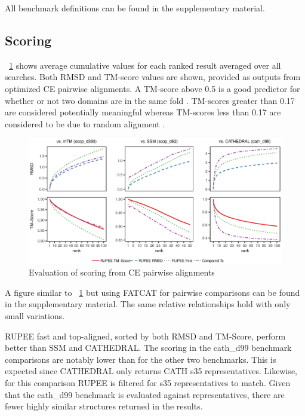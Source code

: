 \documentclass[letter,center,fleqn]{NAR}
\begin{document}
All benchmark definitions can be found in the supplementary material. 

\subsection{Scoring}

\figurename~\ref{fig:combined_scoring_ce} shows average cumulative values for each ranked result averaged over all searches.
Both RMSD and TM-score values are shown, provided as outputs from optimized CE pairwise alignments. 
A TM-score above 0.5 is a good predictor for whether or not two domains are in the same fold \cite{Xu2010}.
TM-scores greater than 0.17 are considered potentially meaningful whereas TM-scores less than 0.17 are considered to be due to random alignment \cite{Zhang2004}.

\begin{figure}[tb]
\begin{center}
\includegraphics{combined_scoring_ce}
\end{center}
\caption{Evaluation of scoring from CE pairwise alignments}
\label{fig:combined_scoring_ce}
\end{figure}

A figure similar to \figurename~\ref{fig:combined_scoring_ce} but using FATCAT for pairwise comparisons can be found in the supplementary material. 
The same relative relationships hold with only small variations. 

RUPEE fast and top-aligned, sorted by both RMSD and TM-Score, perform better than SSM and CATHEDRAL.
The scoring in the cath\_d99 benchmark comparisons are notably lower than for the other two benchmarks. 
This is expected since CATHEDRAL only returns CATH s35 representatives.
Likewise, for this comparison RUPEE is filtered for s35 representatives to match. 
Given that the cath\_d99 benchmark is evaluated against representatives, there are fewer highly similar structures returned in the results. 
\end{document}

